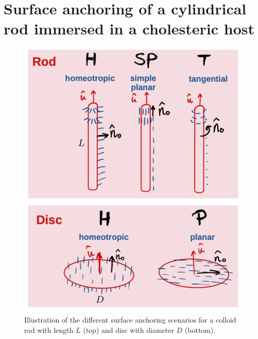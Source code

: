 \section[Surface anchoring of a cylindrical rod]{Surface anchoring of a cylindrical rod immersed in a cholesteric host}


\begin{figure}
	\includegraphics[width = 0.6 \columnwidth]{figures/chapter-3/surfanchoring}
	\caption{ Illustration of the different surface anchoring scenarios for a colloid rod with length $L$ (top) and disc with diameter $D$ (bottom).  }
	\label{surfancho}
\end{figure}





